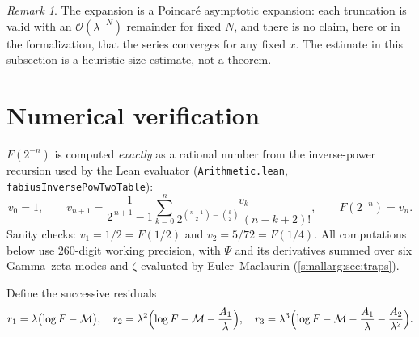 \documentclass[11pt,oneside]{article}
\theoremstyle{definition}
\theoremstyle{remark}
\newtheorem{remark}[remark]{Remark}
\newcommand{\bigO}{\mathcal O}
\begin{document}
\begin{remark}
The expansion is a Poincar\'e asymptotic expansion: each truncation is valid
with an $\bigO(\lambda^{-N})$ remainder for fixed $N$, and there is no claim,
here or in the formalization, that the series converges for any fixed $x$.
The estimate in this subsection is a heuristic size estimate, not a theorem.
\end{remark}

\section{Numerical verification}\label{smallarg:sec:numerics}

$F(2^{-n})$ is computed \emph{exactly} as a rational number from the
inverse-power recursion used by the Lean evaluator
(\nolinkurl{Arithmetic.lean}, \lstinline[style=pseudo]{fabiusInversePowTwoTable}):
\[
  v_0=1,\qquad
  v_{n+1}=\frac{1}{2^{\,n+1}-1}
    \sum_{k=0}^{n}\frac{v_k}{2^{\binom{n+1}{2}-\binom{k}{2}}\,(n-k+2)!},
  \qquad F(2^{-n})=v_n.
\]
Sanity checks: $v_1=1/2=F(1/2)$ and $v_2=5/72=F(1/4)$.  All computations below
use $260$-digit working precision, with $\Psi$ and its derivatives summed over
six Gamma--zeta modes and $\zeta$ evaluated by Euler--Maclaurin
(\cref{smallarg:sec:traps}).

Define the successive residuals
\[
  r_1=\lambda\bigl(\log F-\mathcal M\bigr),\quad
  r_2=\lambda^2\Bigl(\log F-\mathcal M-\frac{A_1}{\lambda}\Bigr),\quad
  r_3=\lambda^3\Bigl(\log F-\mathcal M-\frac{A_1}{\lambda}-\frac{A_2}{\lambda^2}\Bigr).
\]

\begin{center}\small
{}
\end{center}
\end{document}
